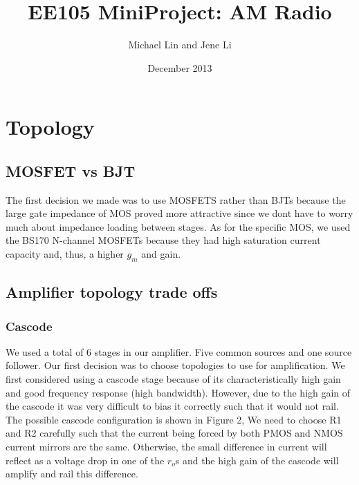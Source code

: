 \documentclass[11pt, twoside, letterpaper]{article}
\title{EE105 MiniProject: AM Radio}
\author{Michael Lin and Jene Li}
\date{December 2013}
\begin{document}
\maketitle

\section{Topology}
\subsection{MOSFET vs BJT}

The first decision we made was to use MOSFETS rather than BJTs because the large gate impedance of MOS proved more attractive since we dont have to
worry much about impedance loading between stages. As for the specific MOS, we used the BS170 N-channel MOSFETs because they had high saturation
current capacity and, thus, a higher $g_m$ and gain.

\subsection{Amplifier topology trade offs}

\subsubsection{Cascode}
We used a total of 6 stages in our amplifier. Five common sources and one source follower.
Our first decision was to choose topologies to use for amplification. We first considered using a cascode stage because of 
its characteristically high gain and good frequency response (high bandwidth). However, due to the high gain of the cascode
it was very difficult to bias it correctly such that it would not rail. The possible cascode configuration is shown in Figure 2,
We need to choose R1 and R2 carefully such that the current being forced by both PMOS and NMOS current mirrors are the same.
Otherwise, the small difference in current will reflect as a voltage drop in one of the $r_o$s and the high gain of the cascode
will amplify and rail this difference.
\end{document}
